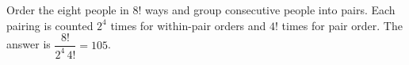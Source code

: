 Order the eight people in $8!$ ways and group consecutive people into pairs. Each pairing is counted $2^4$ times for within-pair orders and $4!$ times for pair order. The answer is $\dfrac{8!}{2^4\,4!}=\boxed{105}$.
